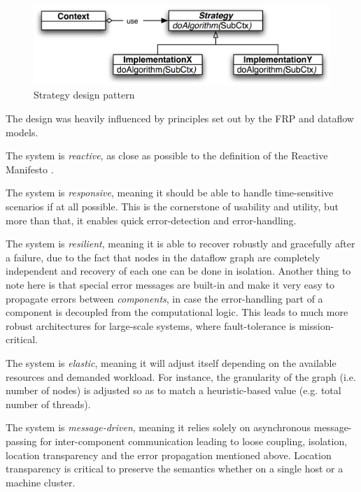 \documentclass{dithesis}
\begin{document}
\begin{figure}[h!] 
	\centering
	\includegraphics[scale=0.1]{strategy}
  	\caption{Strategy design pattern}
\end{figure}

The design was heavily influenced by principles set out by the FRP and dataflow models. 


The system is \textit{reactive}, as close as possible to the definition of the Reactive Manifesto \cite{manifesto}. 

The system is \textit{responsive}, meaning it should be able to handle time-sensitive scenarios if at all possible. This is the cornerstone of usability and utility, but more than that, it enables quick error-detection and error-handling.

The system is \textit{resilient}, meaning it is able to recover robustly and gracefully after a failure, due to the fact that nodes in the dataflow graph are completely independent and recovery of each one can be done in isolation. Another thing to note here is that special error messages are built-in and make it very easy to propagate errors between \textit{components}, in case the error-handling part of a component is decoupled from the computational logic. This leads to much more robust architectures for large-scale systems, where fault-tolerance is mission-critical.

The system is \textit{elastic}, meaning it will adjust itself depending on the available resources and demanded workload. For instance, the granularity of the graph (i.e. number of nodes) is adjusted so as to match a heuristic-based value (e.g. total number of threads).

The system is \textit{message-driven}, meaning it relies solely on asynchronous message-passing for inter-component communication leading to loose coupling, isolation, location transparency and the error propagation mentioned above. Location transparency is critical to preserve the semantics whether on a single host or a machine cluster. 
\end{document}
